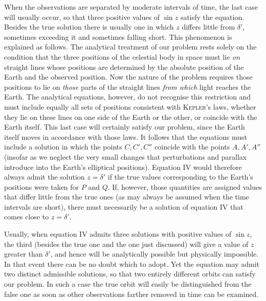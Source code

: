 When the observations are separated by moderate intervals of time, the last case will usually occur, so that three positive values of $\sin z$ satisfy the equation. Besides the true solution there is usually one in which $z$ differs little from $\delta'$, sometimes exceeding it and sometimes falling short. This phenomenon is explained as follows. The analytical treatment of our problem rests solely on the condition that the three positions of the celestial body in space must lie \textit{on} straight lines whose positions are determined by the absolute position of the Earth and the observed position. Now the nature of the problem requires those positions to lie on \textit{those} parts of the straight lines \textit{from which} light reaches the Earth. The analytical equations, however, do not recognise this restriction and must include equally all sets of positions consistent with \textsc{Kepler}'s laws, whether they lie on these lines on one side of the Earth or the other, or coincide with the Earth itself. This last case will certainly satisfy our problem, since the Earth itself moves in accordance with those laws. It follows that the equations must include a solution in which the points $C,C',C''$ coincide with the points $A,A',A''$ (insofar as we neglect the very small changes that perturbations and parallax introduce into the Earth's elliptical positions). Equation IV would therefore always admit the solution $z=\delta'$ if the true values corresponding to the Earth's positions were taken for $P$ and $Q$. If, however, those quantities are assigned values that differ little from the true ones (as may always be assumed when the time intervals are short), there must necessarily be a solution of equation IV that comes close to $z=\delta'$.

Usually, when equation IV admits three solutions with positive values of $\sin z$, the third (besides the true one and the one just discussed) will give a value of $z$ greater than $\delta'$, and hence will be analytically possible but physically impossible. In that event there can be no doubt which to adopt. Yet the equation may admit two distinct admissible solutions, so that two entirely different orbits can satisfy our problem. In such a case the true orbit will easily be distinguished from the false one as soon as other observations farther removed in time can be examined.
